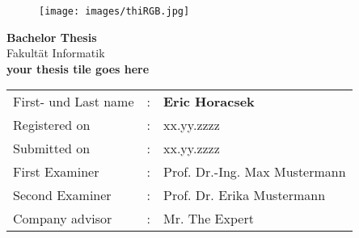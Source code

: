 

\begin{titlepage}	
		\begin{figure}[!h]
			\centering
			\texttt{[image: images/thiRGB.jpg]}	
		\end{figure}																			
	
	\begin{center}
		\hrulefill 
	\end{center}
	
	
	\begin{center}	
		\vspace{1cm}
		
		\huge\textbf{
			Bachelor Thesis}\\[2.5em]
		\normalsize
			Fakultät Informatik	\\ [7em]
	
		\Large\textbf{your thesis tile goes here}	 \\ 

	\end{center}

	\vfill
	
	
	\begin{tabular}{lll}
		First- und Last name &: & \textbf{Eric Horacsek}	\\ [3em]
		
		Registered on &:	& xx.yy.zzzz	\\ [1em] %
		Submitted on &:	& xx.yy.zzzz	\\ [3em] %
		
		First Examiner &: 	& Prof. Dr.-Ing. Max Mustermann	\\ [1em]
		Second Examiner &: 	& Prof. Dr. Erika Mustermann	\\[3em]
		
		Company advisor &:	& Mr. The Expert \\ %
	\end{tabular}
	
\end{titlepage}

\restoregeometry